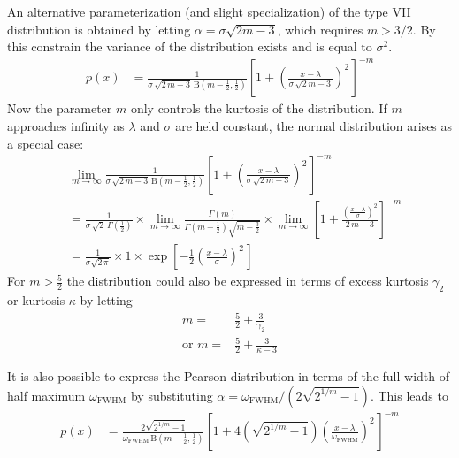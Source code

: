 An alternative parameterization (and slight specialization) of the type VII distribution is obtained by letting
$\alpha=\sigma\sqrt{2m-3}$, which requires $m > 3/2$. By this constrain the variance of the distribution exists and is equal to $\sigma^2$.
\begin{align}
    p(x) &=  \frac{1}{\sigma\,\sqrt{2\,m-3}\,\mathrm{B}\!\left(m-\frac12, \frac12\right)} \left[1 + \left(\frac{x-\lambda}{\sigma\,\sqrt{2\,m-3}}\right)^{\!2\,} \right]^{-m}
\end{align}
Now the parameter $m$ only controls the kurtosis of the distribution. If $m$ approaches infinity as $\lambda$
and $\sigma$ are held constant, the normal distribution arises as a special case:
\begin{align}
& \lim_{m\to\infty}\frac{1}{\sigma\,\sqrt{2\,m-3}\,\mathrm{B}\!\left(m-\frac12, \frac12\right)} \left[1 + \left(\frac{x-\lambda}{\sigma\,\sqrt{2\,m-3}}\right)^{\!2\,} \right]^{-m} \nonumber\\
& = \frac{1}{\sigma\,\sqrt{2}\,\Gamma\!\left(\frac12\right)} \times \lim_{m\to\infty} \frac{\Gamma(m)}{\Gamma\!\left(m-\frac12\right) \sqrt{m-\frac32}} \times \lim_{m\to\infty} \left[1 + \frac{\left(\frac{x-\lambda}{\sigma}\right)^2}{2\,m-3} \right]^{-m} \nonumber\\
& = \frac{1}{\sigma\sqrt{2\,\pi}} \times 1 \times \exp\!\left[-\frac12 \left(\frac{x-\lambda}{\sigma}\right)^{\!2\,} \right] \nonumber
\end{align}
For $m>\frac52$ the distribution could also be expressed in terms of excess kurtosis $\gamma_2$ or kurtosis $\kappa$ by letting
\begin{align}
m =& \frac52+\frac{3}{\gamma_2} \\
\mbox{or } m =& \frac52+\frac{3}{\kappa-3}
\end{align}

It is also possible to express the Pearson distribution in terms of the full width of half maximum $\omega_\mathrm{FWHM}$ by substituting $\alpha=\omega_\mathrm{FWHM}/\left(2\sqrt{2^{1/m}-1}\right)$. This leads to
\begin{align}
    p(x) &= \frac{2\sqrt{2^{1/m}-1}}{\omega_\mathrm{FWHM}\,\mathrm{B}\!\left(m-\frac12, \frac12\right)}
        \left[1 + 4\left(\sqrt{2^{1/m}-1}\right)\left(\frac{x-\lambda}{\omega_\mathrm{FWHM}}\right)^{\!2\,} \right]^{-m}
\end{align}

\clearpage
